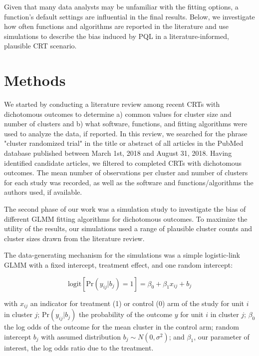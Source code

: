 \documentclass[Afour,times,sagev,doublespace]{sagej}
\begin{document}
Given that many data analysts may be unfamiliar with the fitting options, a function's default settings are influential in the final results. Below, we investigate how often functions and algorithms are reported in the literature and use simulations to describe the bias induced by PQL in a literature-informed, plausible CRT scenario.


\section{Methods}


We started by conducting a literature review among recent CRTs with dichotomous outcomes to determine a) common values for cluster size and number of clusters and b) what software, functions, and fitting algorithms were used to analyze the data, if reported. In this review, we searched for the phrase "cluster randomized trial" in the title or abstract of all articles in the PubMed database published between March 1st, 2018 and August 31, 2018. Having identified candidate articles, we filtered to completed CRTs with dichotomous outcomes. The mean number of observations per cluster and number of clusters for each study was recorded, as well as the software and functions/algorithms the authors used, if available.

The second phase of our work was a simulation study to investigate the bias of different GLMM fitting algorithms for dichotomous outcomes. To maximize the utility of the results, our simulations used a range of plausible cluster counts and cluster sizes drawn from the literature review.

The data-generating mechanism for the simulations was a simple logistic-link GLMM with a fixed intercept, treatment effect, and one random intercept:

\begin{equation}
    \text{logit}[\text{Pr}(y_{ij}|b_j)=1]=\beta_0 + \beta_1 x_{ij} + b_j
\end{equation}

with $x_{ij}$ an indicator for treatment (1) or control (0) arm of the study for unit $i$ in cluster $j$; $\text{Pr}(y_{ij}|b_j)$ the probability of the outcome $y$ for unit $i$ in cluster $j$; $\beta_0$ the log odds of the outcome for the mean cluster in the control arm; random intercept $b_j$ with assumed distribution $b_j \sim N(0, \sigma^2)$; and $\beta_1$, our parameter of interest, the log odds ratio due to the treatment. 
\end{document}
